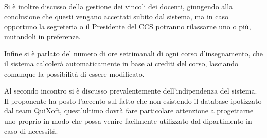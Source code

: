 \documentclass[11pt,a4paper]{article}
\begin{document}
Si è inoltre discusso della gestione dei vincoli dei docenti, giungendo alla conclusione che questi vengano accettati subito dal sistema, ma in caso opportuno la segreteria o il Presidente del CCS potranno rilassarne uno o più, mutandoli in preferenze.

Infine si è parlato del numero di ore settimanali di ogni corso d'insegnamento, che il sistema calcolerà automaticamente in base ai crediti del corso, lasciando comunque la possibilità di essere modificato.


Al secondo incontro si è discusso prevalentemente dell'indipendenza del sistema. Il proponente ha posto l'accento sul fatto che non esistendo il database ipotizzato dal team QuiXoft, quest'ultimo dovrà fare particolare attenzione a progettarne uno proprio in modo che possa venire facilmente utilizzato dal dipartimento in caso di necessità.
\end{document}
